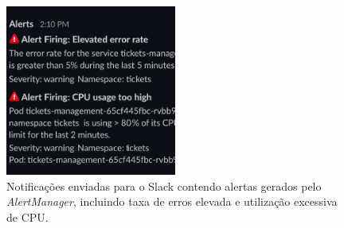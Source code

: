 \begin{figure}[H]
    \centering
    \includegraphics[width=0.5\textwidth]{images/Grafana/alertas.png}
    \caption{Notificações enviadas para o Slack contendo alertas gerados pelo \textit{AlertManager}, incluindo taxa de erros elevada e utilização excessiva de CPU.}
    \label{fig:slack-alerts}
\end{figure}


